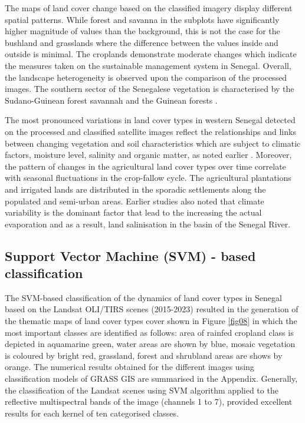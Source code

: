 \documentclass[earth,article,submit,pdftex,moreauthors]{Definitions/mdpi}
\begin{document}
{{The {maps of land cover }change based on the classified imagery display different spatial patterns. While forest and savanna in the subplots{ }have significantly higher magnitude {of }values than the background{,} this is not the case for {the }bushland and grasslands {where the} difference between the values inside and outside is minimal. {The }croplands demonstrate moderate changes which indicate {the measures taken on the }sustainable management system in Senegal. Overall, the landscape heterogeneity is observed upon the comparison of the processed images.} The southern sector of the Senegalese vegetation is characterised by the Sudano-Guinean forest savannah and the Guinean forests \cite{Robequain}. 

{The most pronounced variations} in land cover types in western Senegal {detected on the processed and classified satellite images }reflect the relationships and links between changing vegetation and soil characteristics which are subject to climatic factors, moisture level, salinity and organic matter, as noted earlier \cite{MANLAY200089}. Moreover, {the }pattern of changes in {the agricultural} land cover types over time correlate with seasonal fluctuations in {the }crop-fallow cycle. The agricultural plantations and irrigated lands are distributed in the sporadic settlements along the populated and semi-urban areas. Earlier studies also noted \cite{BENNOUR2023101370} that climate variability is the dominant factor that lead to the increasing the actual evaporation and as a result, {land }salinisation in the {basin of the }Senegal River. 

\subsection{{Support Vector Machine (SVM) - based classification}}

{The {SVM-based} classification of the dynamics of land cover types in Senegal based on the Landsat OLI/TIRS scenes (2015-2023) resulted in the generation of the thematic maps of land cover types cover shown in Figure} \ref{fig08} {in which the most important classes are identified as follows: area of {rainfed} cropland class is depicted in aquamarine green, water areas are shown by blue, mosaic vegetation is coloured by bright red, grassland, forest and shrubland areas are shows by orange. The numerical results obtained for the different images using classification models of GRASS GIS are summarised in the Appendix. Generally, the classification of the Landsat {scenes} using{ }SVM algorithm {applied to} the reflective multispectral bands of the image (channels 1 to 7), provided excellent results for each kernel of ten categorised classes.} 

}
\end{document}
